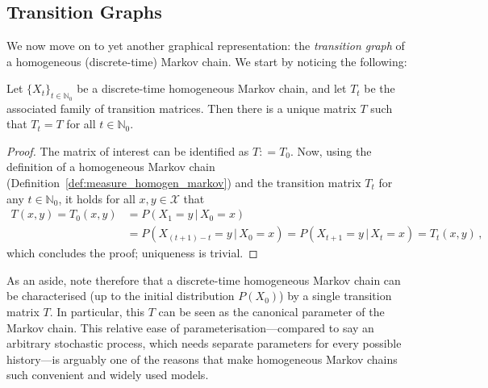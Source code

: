 \documentclass[graybox]{svmult}
\newcommand{\nats}{\mathbb{N}}
\newcommand{\natswith}{\nats_{0}}
\newcommand{\states}{\mathcal{X}}
\newcommand{\coloneqq}{:\!=}
\begin{document}
\subsection{Transition Graphs}\label{sec:trans_graph}

We now move on to yet another graphical representation: the \emph{transition graph} of a homogeneous (discrete-time) Markov chain. We start by noticing the following:
\begin{proposition}\label{prop:homogen_dtmc_has_single_transmat}
Let $\{X_t\}_{t\in\natswith}$ be a discrete-time homogeneous Markov chain, and let $T_t$ be the associated family of transition matrices. Then there is a unique matrix $T$ such that $T_t=T$ for all $t\in\natswith$.
\end{proposition}
\begin{proof}
The matrix of interest can be identified as $T\coloneqq T_0$. Now, using the definition of a homogeneous Markov chain (Definition~\ref{def:measure_homogen_markov}) and the transition matrix $T_t$ for any $t\in\natswith$, it holds for all $x,y\in\states$ that
\begin{align*}
T(x,y) = T_0(x,y) &= P(X_1=y\,\vert\,X_0=x) \\
 &= P(X_{(t+1)-t}=y\,\vert\,X_0=x)=P(X_{t+1}=y\,\vert\,X_t=x)=T_t(x,y)\,,
\end{align*}
which concludes the proof; uniqueness is trivial.
\end{proof}
As an aside, note therefore that a discrete-time homogeneous Markov chain can be characterised (up to the initial distribution $P(X_0)$) by a single transition matrix $T$. In particular, this $T$ can be seen as the canonical parameter of the Markov chain. This relative ease of parameterisation---compared to say an arbitrary stochastic process, which needs separate parameters for every possible history---is arguably one of the reasons that make homogeneous Markov chains such convenient and widely used models.
\end{document}
